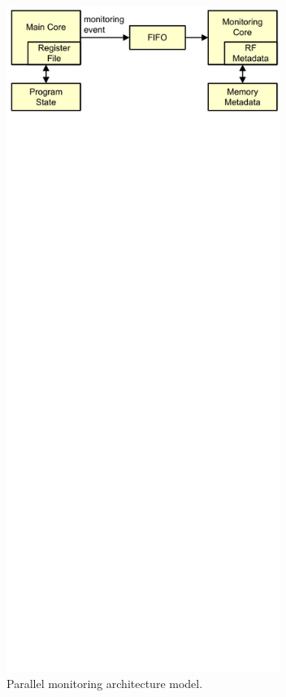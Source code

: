 \begin{figure}
  \begin{center}
    \includegraphics[width=3.5in]{monitoring_wcet/figs/arch.pdf}
    \caption{Parallel monitoring architecture model.}
    \label{fig:monitoring_wcet.monitoring.arch} 
  \end{center}
\end{figure}

